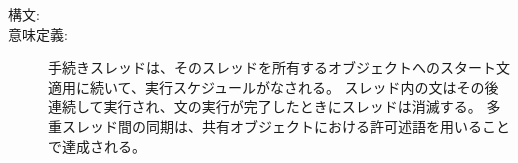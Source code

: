 \documentclass[\pformat,12pt]{jarticle}
\begin{document}
\begin{description}
\item[構文:]  




\item[意味定義:] \mbox{} 
手続きスレッドは、そのスレッドを所有するオブジェクトへのスタート文適用に続いて、実行スケジュールがなされる。
スレッド内の文はその後連続して実行され、文の実行が完了したときにスレッドは消滅する。
多重スレッド間の同期は、共有オブジェクトにおける許可述語を用いることで達成される。
%
%

\end{description}
\end{document}
